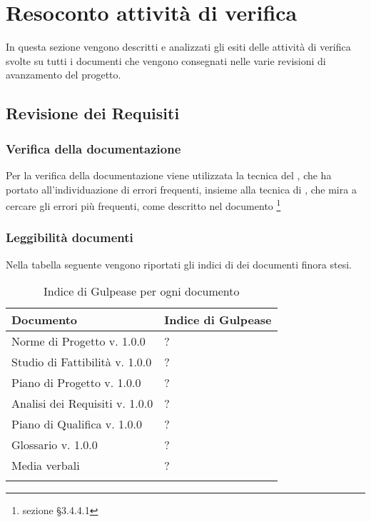\section{Resoconto attività di verifica}
In questa sezione vengono descritti e analizzati gli esiti delle attività di verifica svolte su tutti i documenti che vengono consegnati nelle varie revisioni di avanzamento del progetto.
	\subsection{Revisione dei Requisiti}
		\subsubsection{Verifica della documentazione}
		Per la verifica della documentazione viene utilizzata la tecnica del , che ha portato all'individuazione di errori frequenti, insieme alla tecnica di , che mira a cercare gli errori più frequenti, come descritto nel documento \footnote{sezione §3.4.4.1}
		\subsubsection{Leggibilità documenti}
		Nella tabella seguente vengono riportati gli indici di  dei documenti finora stesi.
		\begin{center}
			\begin{longtable}{|C{8cm}|C{4cm}|}
				\hline
				\textbf{Documento} & \textbf{Indice di Gulpease} \\ 			
				\hline
				\endhead
				
				\hline
				Norme di Progetto v. 1.0.0 & ? \\
				\hline
				Studio di Fattibilità v. 1.0.0 & ? \\
				\hline
				Piano di Progetto v. 1.0.0 & ? \\
				\hline
				Analisi dei Requisiti v. 1.0.0 & ? \\
				\hline
				Piano di Qualifica v. 1.0.0 & ? \\
				\hline
				Glossario v. 1.0.0 & ? \\
				\hline
				Media verbali & ? \\
				\hline
				
				\hiderowcolors
				\caption{Indice di Gulpease per ogni documento}		
			\end{longtable}	
		\end{center}
